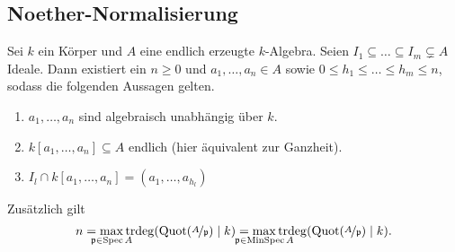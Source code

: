\documentclass[12pt,a4paper]{scrartcl}
\theoremstyle{cplain}
\theoremstyle{cdef}
\begin{document}
\subsection{Noether-Normalisierung}
\begin{satz} \label{thm:noether-normalisierung}
	Sei $k$ ein Körper und $A$ eine endlich erzeugte $k$-Algebra. Seien $I_1\subseteq \dots \subseteq I_m\subsetneq A$ Ideale. Dann existiert ein $n\ge 0$ und $a_1,\dots, a_n\in A$ sowie $0\le h_1\le\dots \le h_m\le n$, sodass die folgenden Aussagen gelten. 
	\begin{enumerate}
		\item $a_1,\dots, a_n$ sind algebraisch unabhängig über $k$.
		\item $k[a_1,\dots, a_n]\subseteq A$ endlich (hier äquivalent zur Ganzheit).
		\item $I_l\cap k[a_1,\dots, a_n] = (a_1,\dots, a_{h_l})$
	\end{enumerate}
	Zusätzlich gilt
	\[n = \max_{\mathclap{\fp\in\Spec A}} \trdeg(\Quot(\fak A\fp)\mid k) = \max_{\mathclap{\fp \in \MinSpec A}}\trdeg(\Quot(\fak A\fp)\mid k).\]
\end{satz}

\end{document}
